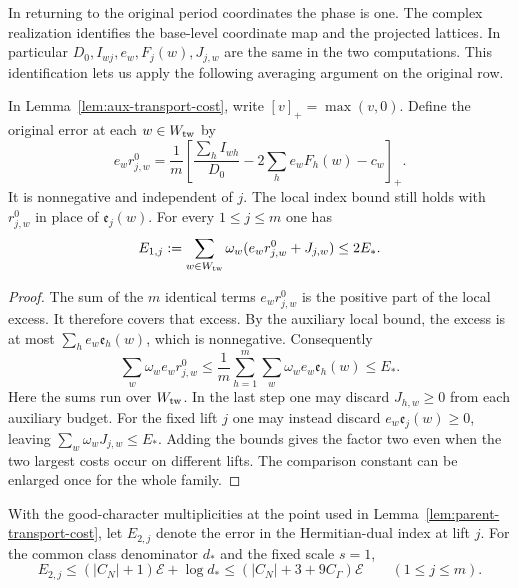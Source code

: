 In returning to the original period coordinates the phase is one.
The complex realization identifies the base-level coordinate map and the
projected lattices. In particular \(D_0,I_{wj}, e_w,F_j(w),J_{j,w}\)
are the same in the two computations. This identification lets us apply
the following averaging argument on the original row.
\label{cor:word-division-1}

\begin{lemma}\label{lem:parent-transport-cost}
In Lemma~\ref{lem:aux-transport-cost}, write \([v]_+=\max(v,0)\).
Define the original error at each \(w\in W_{\rm tw}\) by
\[
 e_w r^0_{j,w}=\frac1m\left[
 \frac{\sum_h I_{wh}}{D_0}-2\sum_h e_w F_h(w)-c_w\right]_+ .
\]
It is nonnegative and independent of \(j\). The local index bound still
holds with \(r^0_{j,w}\) in place of \(\mathfrak e_j(w)\). For every
\(1\le j\le m\) one has
\[
 E_{1,j}:=\sum_{w\in W_{\rm tw}}\omega_w(e_w r^0_{j,w}+J_{j,w})
       \le 2E_* .
\]
\end{lemma}

\begin{proof}
The sum of the \(m\) identical terms \(e_w r^0_{j,w}\) is the
positive part of the local excess. It therefore covers that excess.
By the auxiliary local bound, the excess is at most
\(\sum_h e_w\mathfrak e_h(w)\), which is nonnegative. Consequently
\[
 \sum_w\omega_w e_w r^0_{j,w}
 \le \frac1m\sum_{h=1}^m\sum_w\omega_w e_w\mathfrak e_h(w)
 \le E_* .
\]
Here the sums run over \(W_{\rm tw}\). In the last step one may discard
\(J_{h,w}\ge0\) from each auxiliary budget. For the fixed lift \(j\)
one may instead discard \(e_w\mathfrak e_j(w)\ge0\), leaving
\(\sum_w\omega_w J_{j,w}\le E_*\). Adding the bounds gives the factor
two even when the two largest costs occur on different lifts. The
comparison constant can be enlarged once for the whole family.
\end{proof}

\begin{proposition}\label{prop:parent-dual-cost}
With the good-character multiplicities at the point used in
Lemma~\ref{lem:parent-transport-cost}, let \(E_{2,j}\) denote the
error in the Hermitian-dual index at lift \(j\). For the common
class denominator \(d_*\) and the fixed scale \(s=1\),
\[
 E_{2,j}\le (|C_N|+1)\mathcal E+\log d_*
       \le (|C_N|+3+9C_\Gamma)\mathcal E\qquad(1\le j\le m).
\]
\end{proposition}

